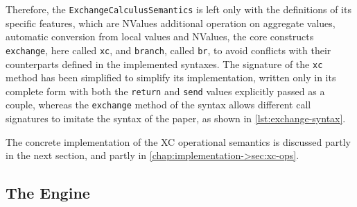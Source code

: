 Therefore, the \texttt{ExchangeCalculusSemantics} is left only with the definitions of its specific features, which are NValues additional operation on aggregate values, automatic conversion from local values and NValues, the core constructs \texttt{exchange}, here called \texttt{xc}, and \texttt{branch}, called \texttt{br}, to avoid conflicts with their counterparts defined in the implemented syntaxes.
%
The signature of the \texttt{xc} method has been simplified to simplify its implementation, written only in its complete form with both the \texttt{return} and \texttt{send} values explicitly passed as a couple, whereas the \texttt{exchange} method of the syntax allows different call signatures to imitate the syntax of the paper\cite{xc}, as shown in \cref{lst:exchange-syntax}.



The concrete implementation of the \ac{XC} operational semantics is discussed partly in the next section, and partly in \cref{chap:implementation->sec:xc-ops}.

\subsection{The Engine} \label{chap:design->sec:final-dsl->subsec:engine}

